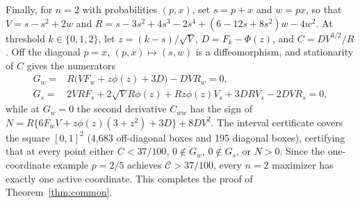 Finally, for $n=2$ with probabilities $(p,x)$, set $s=p+x$ and $w=px$, so
that $V=s-s^2+2w$ and $R=s-3s^2+4s^3-2s^4+(6-12s+8s^2)w-4w^2$. At threshold
$k\in\{0,1,2\}$, let $z=(k-s)/\sqrt V$, $D=F_k-\Phi(z)$, and $C=DV^{3/2}/R$.
Off the diagonal $p=x$, $(p,x)\mapsto(s,w)$ is a diffeomorphism, and
stationarity of $C$ gives the numerators
\begin{align*}
 G_w={}&R\bigl(VF_w+z\phi(z)+3D\bigr)-DVR_w=0,\\
 G_s={}&2VRF_s+2\sqrt V R\phi(z)+Rz\phi(z)V_s
                           +3DRV_s-2DVR_s=0,
\end{align*}
while at $G_w=0$ the second derivative $C_{ww}$ has the sign of
$N=R\{6F_wV+z\phi(z)(3+z^2)+3D\}+8DV^2$. The interval certificate
 covers the square $[0,1]^2$
(4,683 off-diagonal boxes and 195 diagonal boxes), certifying that at every
point either $C<37/100$, $0\notin G_w$, $0\notin G_s$, or $N>0$. Since the
one-coordinate example $p=2/5$ achieves $\mathcal C>37/100$, every $n=2$
maximizer has exactly one active coordinate. This completes the proof of
Theorem~\ref{thm:common}.
